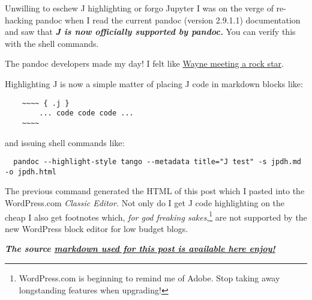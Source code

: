 Unwilling to eschew J highlighting or forgo Jupyter I was on the verge
of re-hacking pandoc when I read the current pandoc (version 2.9.1.1)
documentation and saw that \textbf{\emph{J is now officially supported
by pandoc.}} You can verify this with the shell commands.

The pandoc developers made my day! I felt like
\href{https://www.youtube.com/watch?v=lBEn3a4TIUw}{Wayne meeting a rock
star}.

Highlighting J is now a simple matter of placing J code in markdown
blocks like:

\begin{tcolorbox}[breakable, size=fbox, boxrule=1pt, pad at break*=1mm,colback=cellbackground, colframe=cellborder]
\begin{verbatim}
    ~~~~ { .j }
        ... code code code ...
    ~~~~
\end{verbatim}
\end{tcolorbox}

and issuing shell commands like:


\begin{tcolorbox}[breakable, size=fbox, boxrule=1pt, pad at break*=1mm,colback=cellbackground, colframe=cellborder]
\begin{verbatim}
  pandoc --highlight-style tango --metadata title="J test" -s jpdh.md -o jpdh.html
\end{verbatim}
\end{tcolorbox}


The previous command generated the HTML of this post which I pasted into
the WordPress.com \emph{Classic Editor.} Not only do I get J code
highlighting on the cheap I also get footnotes which, \emph{for god
freaking sakes},\footnote{WordPress.com is beginning to remind me of Adobe. Stop taking away
 longstanding features when upgrading!
} are not
supported by the new WordPress block editor for low budget blogs.

\medskip

\textbf{\emph{The source \href{https://github.com/bakerjd99/jacks/tree/master/pandocexamples}{markdown used for this post is available here enjoy!}}}

